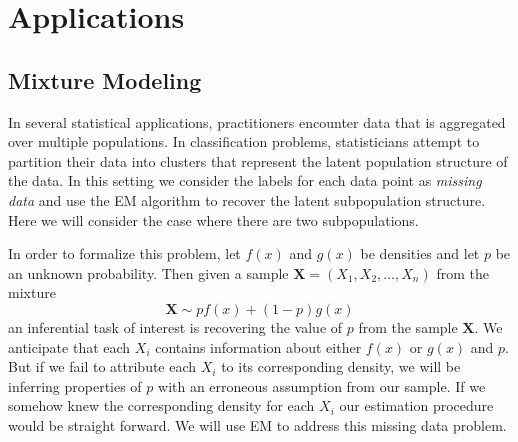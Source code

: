 \documentclass{article}
\begin{document}
\section{Applications}
\subsection{Mixture Modeling}

In several statistical applications, practitioners encounter data that is aggregated over multiple populations. In classification problems, statisticians attempt to partition their data into clusters that represent the latent population structure of the data. In this setting we consider the labels for each data point as \textit{missing data} and use the EM algorithm to recover the latent subpopulation structure. Here we will consider the case where there are two subpopulations. 

In order to formalize this problem, let $f(x)$ and $g(x)$ be densities and let $p$ be an unknown probability. Then given a sample $\mathbf{X} = (X_1, X_2, \ldots, X_n)$ from the mixture $$\mathbf{X}\sim pf(x) + (1-p)g(x)$$ an inferential task of interest is recovering the value of $p$ from the sample $\mathbf{X}$. We anticipate that each $X_i$ contains information about either $f(x)$ or $g(x)$ and $p$. But if we fail to attribute each $X_i$ to its corresponding density, we will be inferring properties of $p$ with an erroneous assumption from our sample. If we somehow knew the corresponding density for each $X_i$ our estimation procedure would be straight forward. We will use EM to address this missing data problem. 
\end{document}
